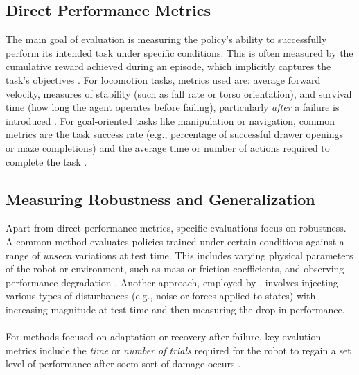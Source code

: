 \documentclass[12pt, a4paper]{article} %
\begin{document}
\subsection{Direct Performance Metrics}
The main goal of evaluation is measuring the policy's ability to successfully perform its intended task under specific conditions. This is often measured by the cumulative reward achieved during an episode, which implicitly captures the task’s objectives \citep{pinto2017robust, shen2020deep}. For locomotion tasks, metrics used are: average forward velocity, measures of stability (such as fall rate or torso orientation), and survival time (how long the agent operates before failing), particularly \textit{after} a failure is introduced \citep{liu2023saving}. For goal-oriented tasks like manipulation or navigation, common metrics are the task success rate (e.g., percentage of successful drawer openings or maze completions) and the average time or number of actions required to complete the task \citep{pham2024adaptive, chatzilygeroudis2018reset, allard2023online}.
\subsection{Measuring Robustness and Generalization}
Apart from direct performance metrics, specific evaluations focus on robustness. A common method evaluates  policies trained under certain conditions against a range of \textit{unseen} variations at test time. This includes varying physical parameters of the robot or environment, such as mass or friction coefficients, and observing performance degradation \citep{rajeswaran2016epopt, pinto2017robust, tessler2019action}. Another approach,  employed by \citet{glossop2022characterising}, involves injecting various types of disturbances (e.g., noise or forces applied to states) with increasing magnitude at test time and then measuring the drop in performance.\noindent
\\\\
For methods focused on adaptation or recovery after failure, key evalution metrics include the \textit{time} or \textit{number of trials} required for the robot to regain a set level of performance after soem sort of damage occurs \citep{cully2015robots, chatzilygeroudis2018reset}.
\end{document}
